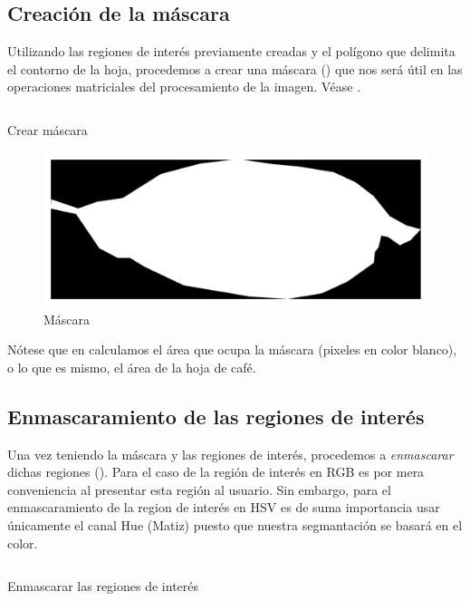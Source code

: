 \subsection{Creación de la máscara}
Utilizando las regiones de interés previamente creadas y el polígono que delimita el contorno de la hoja, procedemos a crear una máscara () que nos será útil en las operaciones matriciales del procesamiento de la imagen. Véase .

\begin{listing}[!ht]
\inputminted{python}{code_listings/mask.py}
\caption{Crear máscara}
\label{code:mask}
\end{listing}

\begin{figure}[!ht]
\centering
\includegraphics[scale=1]{images/mask.png}
\caption{Máscara}
\label{img:mask}
\end{figure}

Nótese que en  calculamos el área que ocupa la máscara (pixeles en color blanco), o lo que es mismo, el área de la hoja de café.

\subsection{Enmascaramiento de las regiones de interés}
Una vez teniendo la máscara y las regiones de interés, procedemos a \textit{enmascarar} dichas regiones (). Para el caso de la región de interés en \textsf{RGB} es por mera conveniencia al presentar esta región al usuario. Sin embargo, para el enmascaramiento de la region de interés en \textsf{HSV} es de suma importancia usar únicamente el canal Hue (Matiz) puesto que nuestra segmantación se basará en el color.

\begin{listing}[!ht]
\inputminted{python}{code_listings/masked_roi.py}
\caption{Enmascarar las regiones de interés}
\label{code:masked_roi}
\end{listing}

